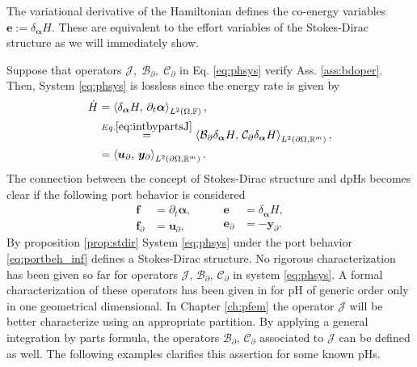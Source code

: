 \begin{remark}
	The variational derivative of the Hamiltonian defines the co-energy variables $\bm{e}:=\delta_{\bm{\alpha}} H$. These are equivalent to the effort variables of the Stokes-Dirac structure as we will immediately show.
\end{remark}

Suppose that operators $\mathcal{J}, \; \mathcal{B}_\partial, \;  \mathcal{C}_\partial$ in Eq. \ref{eq:phsys} verify Ass. \ref{ass:bdoper}. Then, System \eqref{eq:phsys} is lossless since the energy rate is  given by 
\begin{equation}\label{eq:enrate}
\begin{aligned}
\dot{H} &= \inner[L^2(\Omega, \bbF)]{\delta_{\bm{\alpha}} H}{\partial_t \bm{\alpha}}, \\
&\stackrel{Eq. \eqref{eq:intbypartsJ}}{=} \inner[L^2(\partial\Omega, \bbR^m)]{\mathcal{B}_\partial \delta_{\bm{\alpha}} H}{\mathcal{C}_\partial \delta_{\bm{\alpha}} H}, \\
&= \inner[L^2(\partial\Omega, \bbR^m)]{\bm{u}_\partial}{\bm{y}_\partial}. \
\end{aligned}
\end{equation} 
The connection between the concept of Stokes-Dirac structure and dpHs becomes clear if the following port behavior is considered
\begin{equation}\label{eq:portbeh_inf}
\begin{aligned}
\bm{f} &= \partial_t \bm{\alpha}, \\
\bm{f}_\partial &= \bm{u}_\partial, 
\end{aligned} \qquad
\begin{aligned}
\bm{e} &= \delta_{\bm{\alpha}} H, \\
\bm{e}_\partial &= -\bm{y}_\partial. 
\end{aligned}
\end{equation}
By proposition \eqref{prop:stdir} System \eqref{eq:phsys} under the port behavior \eqref{eq:portbeh_inf} defines a Stokes-Dirac structure.  
No rigorous characterization has been given so far for operators $\mathcal{J}, \, \mathcal{B_\partial,\, C_\partial}$ in system \eqref{eq:phsys}. A formal characterization of these operators has been given in \cite{legorrec2005} for pH of generic order only in one geometrical dimensional. In Chapter \ref{ch:pfem} the operator $\mathcal{J}$ will be better characterize using an appropriate partition. By applying a general integration by parts formula, the operators $\mathcal{B_\partial,\, C_\partial}$ associated to $\mathcal{J}$ can be defined as well. The following examples clarifies this assertion for some known pHs.


